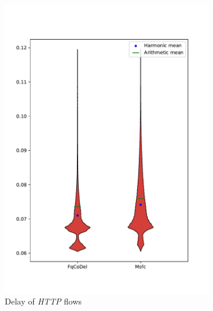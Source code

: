 \begin{figure}
\begin{subfigure}[b]{0.475\textwidth}
		\includegraphics[width=\textwidth]{drawings/type4-delay-down_B}
		\caption[]%
		{{\small Delay of \emph{HTTP} flows}}    
		\label{fig:delay_http_B}
	\end{subfigure}
	\quad
	\begin{subfigure}[b]{0.475\textwidth}   
		\centering 

\end{subfigure}
\end{figure}
